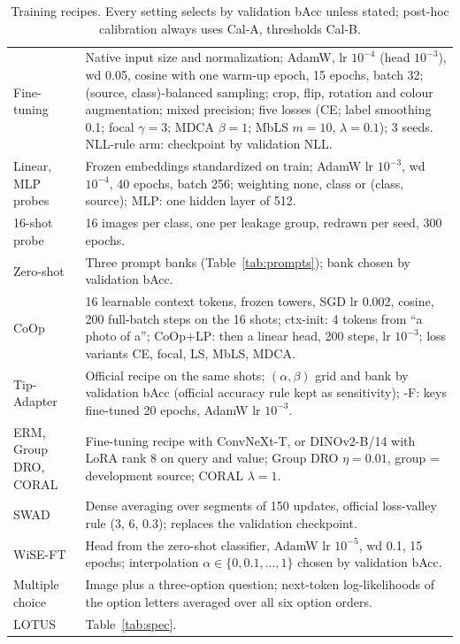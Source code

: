 \documentclass[runningheads]{llncs}
\begin{document}
\begin{table}[htbp]
\caption{Training recipes. Every setting selects by validation bAcc unless stated; post-hoc calibration always uses Cal-A, thresholds Cal-B.}\label{tab:recipe}\centering\scriptsize
\begin{tabular}{@{}p{}p{}@{}}
\toprule
Fine-tuning & Native input size and normalization; AdamW, lr $10^{-4}$ (head $10^{-3}$), wd 0.05, cosine with one warm-up epoch, 15 epochs, batch 32; (source, class)-balanced sampling; crop, flip, rotation and colour augmentation; mixed precision; five losses (CE; label smoothing 0.1; focal $\gamma{=}3$; MDCA $\beta{=}1$; MbLS $m{=}10$, $\lambda{=}0.1$); 3 seeds. NLL-rule arm: checkpoint by validation NLL.\\
Linear, MLP probes & Frozen embeddings standardized on train; AdamW lr $10^{-3}$, wd $10^{-4}$, 40 epochs, batch 256; weighting none, class or (class, source); MLP: one hidden layer of 512.\\
16-shot probe & 16 images per class, one per leakage group, redrawn per seed, 300 epochs.\\
Zero-shot & Three prompt banks (Table~\ref{tab:prompts}); bank chosen by validation bAcc.\\
CoOp & 16 learnable context tokens, frozen towers, SGD lr 0.002, cosine, 200 full-batch steps on the 16 shots; ctx-init: 4 tokens from ``a photo of a''; CoOp+LP: then a linear head, 200 steps, lr $10^{-3}$; loss variants CE, focal, LS, MbLS, MDCA.\\
Tip-Adapter & Official recipe on the same shots; $(\alpha,\beta)$ grid and bank by validation bAcc (official accuracy rule kept as sensitivity); -F: keys fine-tuned 20 epochs, AdamW lr $10^{-3}$.\\
ERM, Group DRO, CORAL & Fine-tuning recipe with ConvNeXt-T, or DINOv2-B/14 with LoRA rank 8 on query and value; Group DRO $\eta{=}0.01$, group = development source; CORAL $\lambda{=}1$.\\
SWAD & Dense averaging over segments of 150 updates, official loss-valley rule (3, 6, 0.3); replaces the validation checkpoint.\\
WiSE-FT & Head from the zero-shot classifier, AdamW lr $10^{-5}$, wd 0.1, 15 epochs; interpolation $\alpha\in\{0,0.1,\dots,1\}$ chosen by validation bAcc.\\
Multiple choice & Image plus a three-option question; next-token log-likelihoods of the option letters averaged over all six option orders.\\
LOTUS & Table~\ref{tab:spec}.\\
\bottomrule
\end{tabular}
\end{table}
\end{document}
